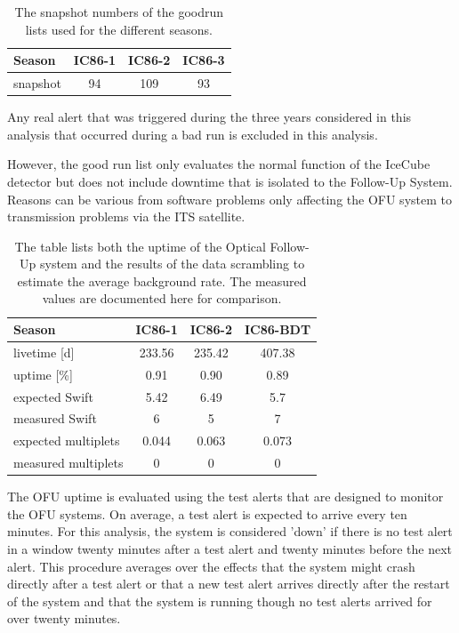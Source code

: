 \begin{table}[h]
  \centering
  \begin{tabular}{l||c|c|c}
  Season & IC86-1 & IC86-2 & IC86-3 \\
  \hline
  snapshot & 94 & 109 & 93 \\
  \end{tabular}
  \caption{The snapshot numbers of the goodrun lists used for the different 
seasons.}
  \label{tab:goodrunlists}
\end{table}
Any real alert that was triggered during the three years considered in this 
analysis that occurred during a bad run is excluded in this analysis.

However, the good run list only evaluates the normal function of the IceCube 
detector but does not include downtime that is isolated to the Follow-Up 
System. Reasons can be various from software problems only affecting the OFU 
system to transmission problems via the ITS satellite.

\begin{table}[h]
  \centering
  \begin{tabular}{l|c|c|c}
   Season & IC86-1 & IC86-2 & IC86-BDT \\
\hline
   livetime [d] & 233.56 & 235.42 & 407.38 \\
   uptime [\%] & 0.91 & 0.90 & 0.89 \\
\hline
   expected Swift & 5.42 & 6.49 & 5.7 \\
   measured Swift & 6 & 5 &  7 \\
\hline
   expected multiplets & 0.044 & 0.063 &  0.073 \\
   measured multiplets & 0 & 0 & 0 \\
  \end{tabular}
  \caption{The table lists both the uptime of the Optical Follow-Up system and 
the results of the data scrambling to estimate the average background rate. The 
measured values are documented here for comparison.%
}
  \label{tab:scrambling_results}
\end{table}
The OFU uptime is 
evaluated using the test alerts that are designed to monitor the OFU systems.
On average, a test alert is expected to arrive every ten minutes. For this 
analysis, the system is considered 'down' if there is no test alert in a 
window twenty minutes after a test alert and twenty minutes before the next 
alert. This procedure averages over the effects that the system might crash 
directly after a test alert or that a new test alert arrives directly after the 
restart of the system and that the system is running though no test alerts 
arrived for over twenty minutes.

